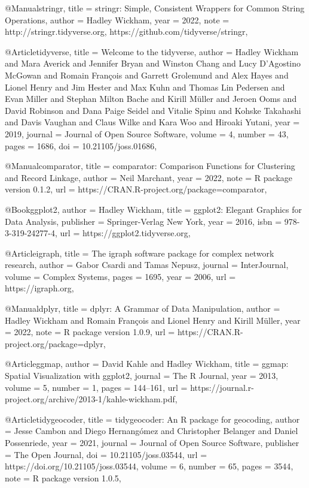 @Manual{stringr,
    title = {stringr: Simple, Consistent Wrappers for Common String Operations},
    author = {Hadley Wickham},
    year = {2022},
    note = {http://stringr.tidyverse.org, https://github.com/tidyverse/stringr},
  }

  @Article{tidyverse,
    title = {Welcome to the {tidyverse}},
    author = {Hadley Wickham and Mara Averick and Jennifer Bryan and Winston Chang and Lucy D'Agostino McGowan and Romain François and Garrett Grolemund and Alex Hayes and Lionel Henry and Jim Hester and Max Kuhn and Thomas Lin Pedersen and Evan Miller and Stephan Milton Bache and Kirill Müller and Jeroen Ooms and David Robinson and Dana Paige Seidel and Vitalie Spinu and Kohske Takahashi and Davis Vaughan and Claus Wilke and Kara Woo and Hiroaki Yutani},
    year = {2019},
    journal = {Journal of Open Source Software},
    volume = {4},
    number = {43},
    pages = {1686},
    doi = {10.21105/joss.01686},
  }
  
    @Manual{comparator,
    title = {comparator: Comparison Functions for Clustering and Record Linkage},
    author = {Neil Marchant},
    year = {2022},
    note = {R package version 0.1.2},
    url = {https://CRAN.R-project.org/package=comparator},
  }
  
    @Book{ggplot2,
    author = {Hadley Wickham},
    title = {ggplot2: Elegant Graphics for Data Analysis},
    publisher = {Springer-Verlag New York},
    year = {2016},
    isbn = {978-3-319-24277-4},
    url = {https://ggplot2.tidyverse.org},
  }
  
    @Article{igraph,
    title = {The igraph software package for complex network research},
    author = {Gabor Csardi and Tamas Nepusz},
    journal = {InterJournal},
    volume = {Complex Systems},
    pages = {1695},
    year = {2006},
    url = {https://igraph.org},
  }
  
    @Manual{dplyr,
    title = {dplyr: A Grammar of Data Manipulation},
    author = {Hadley Wickham and Romain François and Lionel Henry and Kirill Müller},
    year = {2022},
    note = {R package version 1.0.9},
    url = {https://CRAN.R-project.org/package=dplyr},
  }
  
  @Article{ggmap,
    author = {David Kahle and Hadley Wickham},
    title = {ggmap: Spatial Visualization with ggplot2},
    journal = {The R Journal},
    year = {2013},
    volume = {5},
    number = {1},
    pages = {144--161},
    url = {https://journal.r-project.org/archive/2013-1/kahle-wickham.pdf},
  }
  
    @Article{tidygeocoder,
    title = {tidygeocoder: An R package for geocoding},
    author = {Jesse Cambon and Diego Hernangómez and Christopher Belanger and Daniel Possenriede},
    year = {2021},
    journal = {Journal of Open Source Software},
    publisher = {The Open Journal},
    doi = {10.21105/joss.03544},
    url = {https://doi.org/10.21105/joss.03544},
    volume = {6},
    number = {65},
    pages = {3544},
    note = {R package version 1.0.5},
  }
  
